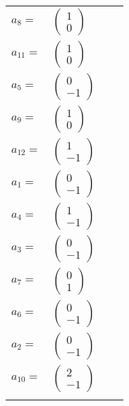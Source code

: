 \documentclass[1p]{elsarticle_modified}
\theoremstyle{definition}
\begin{document}
\begin{tabular}{m{7pt} m{180pt} m{7pt} m{180pt} }
\flushright $a_{8}=$&$\begin{pmatrix}1\\0\end{pmatrix}$ \\
\flushright $a_{11}=$&$\begin{pmatrix}1\\0\end{pmatrix}$ \\
\flushright $a_{5}=$&$\begin{pmatrix}0\\-1\end{pmatrix}$ \\
\flushright $a_{9}=$&$\begin{pmatrix}1\\0\end{pmatrix}$ \\
\flushright $a_{12}=$&$\begin{pmatrix}1\\-1\end{pmatrix}$ \\
\flushright $a_{1}=$&$\begin{pmatrix}0\\-1\end{pmatrix}$ \\
\flushright $a_{4}=$&$\begin{pmatrix}1\\-1\end{pmatrix}$ \\
\flushright $a_{3}=$&$\begin{pmatrix}0\\-1\end{pmatrix}$ \\
\flushright $a_{7}=$&$\begin{pmatrix}0\\1\end{pmatrix}$ \\
\flushright $a_{6}=$&$\begin{pmatrix}0\\-1\end{pmatrix}$ \\
\flushright $a_{2}=$&$\begin{pmatrix}0\\-1\end{pmatrix}$ \\
\flushright $a_{10}=$&$\begin{pmatrix}2\\-1\end{pmatrix}$\\&\end{tabular}
\end{document}
